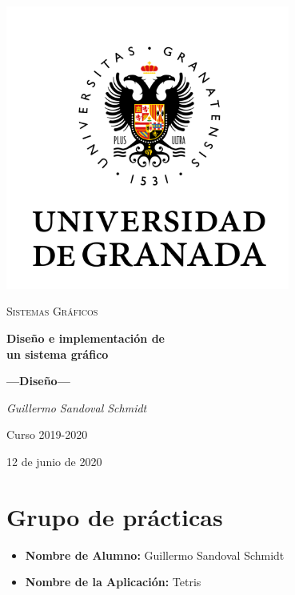 \documentclass[11pt,a4paper]{article}
\begin{document}
\sloppy
\begin{titlepage}
  \centering
  \includegraphics[width=0.7\textwidth]{logo.png}\par\vspace{1cm}
  {\scshape\large Sistemas Gráficos \par} \vspace{1cm}
  {\huge\bfseries Diseño e implementación de \\ un sistema gráfico \par}
  \vspace{0.4cm}
  {\large\bfseries ---Diseño---\\}
  \vspace{0.6cm}
  {\large\itshape  Guillermo Sandoval Schmidt  \par} \vspace{1.00cm}
  Curso 2019-2020 \\
  \vfill

  {\large 12 de junio de 2020 \par}
\end{titlepage}

\tableofcontents
\thispagestyle{empty}

\newpage

\section{Grupo de prácticas}
\begin{itemize}
    \item \textbf{Nombre de Alumno:} Guillermo Sandoval Schmidt
    \item \textbf{Nombre de la Aplicación:} Tetris
\end{itemize}
\end{document}
